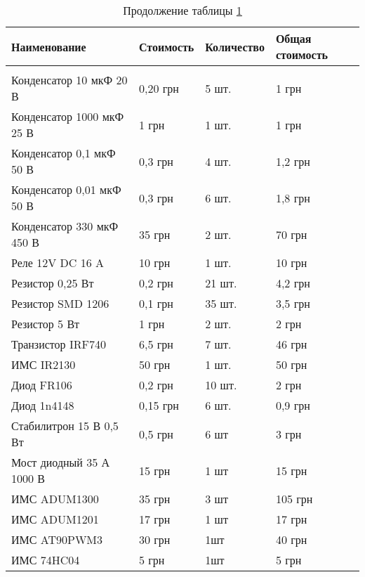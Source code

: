         \begin{longtable}{|p{8cm}|p{}|p{}|p{}|}
        \caption{Стоимость оборудования
            новой системы \label{table:cost-new}}\\
        \hline
        Наименование & Стоимость & Количество & Общая стоимость\\
        \hline
        \endfirsthead
        \caption*{Продолжение таблицы
            \ref{table:cost-new}}\\
        \hline
        \endhead
        Конденсатор 10 мкФ 20 В & 0,20 грн & 5 шт. & 1 грн \\
        \hline
        Конденсатор 1000 мкФ 25 В & 1 грн & 1 шт. & 1 грн \\
        \hline
        Конденсатор 0,1 мкФ 50 В & 0,3 грн & 4 шт. & 1,2 грн \\
        \hline
        Конденсатор 0,01 мкФ 50 В & 0,3 грн & 6 шт. & 1,8 грн \\
        \hline
        Конденсатор 330 мкФ 450 В & 35 грн & 2 шт. & 70 грн \\
        \hline
        Реле 12V DC 16 A & 10 грн & 1 шт. & 10 грн \\
        \hline
        Резистор 0,25 Вт & 0,2 грн & 21 шт. & 4,2 грн \\
        \hline
        Резистор SMD 1206 & 0,1 грн & 35 шт. & 3,5 грн \\
        \hline
        Резистор 5 Вт & 1 грн & 2 шт. & 2 грн \\
        \hline
        Транзистор IRF740 & 6,5 грн & 7 шт. & 46 грн \\
        \hline
        ИМС IR2130 & 50 грн & 1 шт. & 50 грн \\
        \hline
        Диод FR106 & 0,2 грн & 10 шт. & 2 грн \\
        \hline
        Диод 1n4148 & 0,15 грн & 6 шт. & 0,9 грн \\
        \hline
        Стабилитрон 15 В 0,5 Вт & 0,5 грн & 6 шт & 3 грн \\
        \hline
        Мост диодный 35 А 1000 В & 15 грн & 1 шт & 15 грн \\
        \hline
        ИМС ADUM1300 & 35 грн & 3 шт & 105 грн \\
        \hline
        ИМС ADUM1201 & 17 грн & 1 шт & 17 грн \\
        \hline
        ИМС AT90PWM3 & 30 грн & 1шт & 40 грн \\
        \hline
        ИМС 74HC04 & 5 грн & 1шт & 5 грн \\

\end{longtable}
